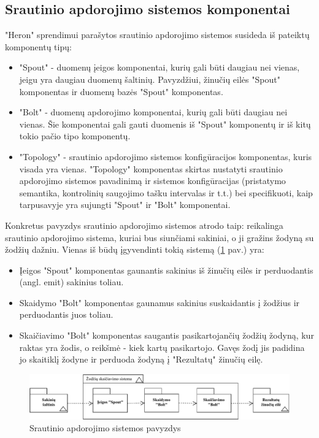 \documentclass{VUMIFPSbakalaurinis}
\begin{document}
\subsection{Srautinio apdorojimo sistemos komponentai}
"Heron" sprendimui parašytos srautinio apdorojimo sistemos susideda iš pateiktų komponentų tipų:
\begin{itemize}
    \item "Spout" - duomenų įeigos komponentai, kurių gali būti daugiau nei vienas, jeigu yra daugiau duomenų šaltinių. Pavyzdžiui, žinučių eilės "Spout" komponentas ir duomenų bazės "Spout" komponentas.
    \item "Bolt" - duomenų apdorojimo komponentai, kurių gali būti daugiau nei vienas. Šie komponentai gali gauti duomenis iš "Spout" komponentų ir iš kitų tokio pačio tipo komponentų.
    \item "Topology" - srautinio apdorojimo sistemos konfigūracijos komponentas, kuris visada yra vienas. "Topology" komponentas skirtas nustatyti srautinio apdorojimo sistemos pavadinimą ir sistemos konfigūracijas (pristatymo semantika, kontrolinių saugojimo tašku intervalas ir t.t.) bei specifikuoti, kaip tarpusavyje yra sujungti "Spout" ir "Bolt" komponentai. 
\end{itemize}\par
Konkretus pavyzdys srautinio apdorojimo sistemos atrodo taip:
reikalinga srautinio apdorojimo sistema, kuriai bus siunčiami sakiniai, o ji gražins žodyną su žodžių dažniu. Vienas iš būdų įgyvendinti tokią sistemą (\ref{img:system-example} pav.) yra:
\begin{itemize}
    \item Įeigos "Spout" komponentas gaunantis sakinius iš žinučių eilės ir perduodantis (angl. emit) sakinius toliau.
    \item Skaidymo "Bolt" komponentas gaunamus sakinius suskaidantis į žodžius ir perduodantis juos toliau.
    \item Skaičiavimo "Bolt" komponentas saugantis pasikartojančių žodžių žodyną, kur raktas yra žodis, o reikšmė - kiek kartų pasikartojo. Gavęs žodį jis padidina jo skaitiklį žodyne ir perduoda žodyną į "Rezultatų" žinučių eilę.
\end{itemize}
\begin{figure}[H]
    \centering
    \includegraphics[width=1\textwidth]{img/pavyzdine_sistema.pdf}
    \caption{Srautinio apdorojimo sistemos pavyzdys}
    \label{img:system-example}
\end{figure}
\end{document}
